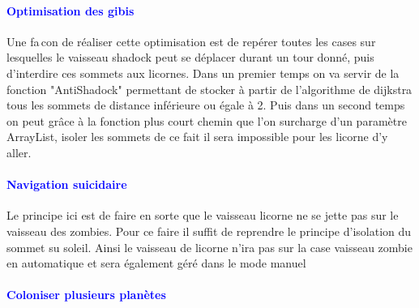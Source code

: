 \documentclass{report}
\begin{document}
			\paragraph{\textcolor{blue}{Optimisation des gibis}}
			Une fa\,con de r\'ealiser cette optimisation est de rep\'erer toutes les cases sur lesquelles le vaisseau shadock peut se d\'eplacer durant un tour donn\'e, puis d'interdire ces sommets aux licornes.
			Dans un premier temps on va servir de la fonction "AntiShadock" permettant de stocker à partir de l'algorithme de dijkstra tous les sommets de distance inf\'erieure ou \'egale \`a 2.
			Puis dans un second temps on peut grâce à la fonction plus court chemin que l'on surcharge d'un paramètre ArrayList, isoler les sommets de ce fait il sera impossible pour les licorne d'y aller.
			\paragraph{\textcolor{blue}{Navigation suicidaire}}
			Le principe ici est de faire en sorte que le vaisseau licorne ne se jette pas sur le vaisseau des zombies.
			Pour ce faire il suffit de reprendre le principe d'isolation du sommet su soleil.
			Ainsi le vaisseau de licorne n'ira pas sur la case vaisseau zombie en automatique et sera également géré dans le mode manuel
			\paragraph{\textcolor{blue}{Coloniser plusieurs planètes}}
	
\end{document}
